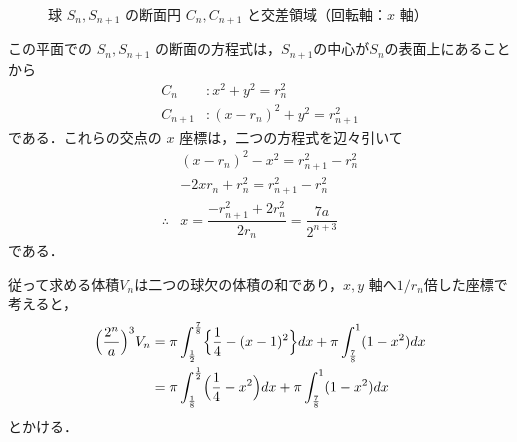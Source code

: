 \documentclass[../../main.tex]{subfiles}
\begin{document}
\begin{figure}[htb]
  \caption{球 $S_n, S_{n+1}$ の断面円 $C_n, C_{n+1}$ と交差領域（回転軸：$x$ 軸）}
  \label{fig:sphere_intersection_cross_section}
\end{figure}

この平面での $S_n, S_{n+1}$ の断面の方程式は，$S_{n+1}$の中心が$S_{n}$の表面上にあることから
\begin{align}
  C_n &: x^2 + y^2 = r_n^2 \\
  C_{n+1} &: (x - r_n)^2 + y^2 = r_{n+1}^2
\end{align}
である．これらの交点の $x$ 座標は，二つの方程式を辺々引いて
\begin{align}
  & (x - r_n)^2 - x^2 = r_{n+1}^2 - r_{n}^2 \\
  & -2xr_n + r_n^2 = r_{n+1}^2 - r_{n}^2 \\
  \therefore
  & x = \dfrac{-r_{n+1}^2 + 2r_{n}^2}{2r_{n}} = \dfrac{7a}{2^{n+3}}
\end{align}
である．

従って求める体積$V_n$は二つの球欠の体積の和であり，$x, y$ 軸へ$1/r_n$倍した座標で考えると，
\begin{align}
  \Bigl( \dfrac{2^n}{a} \Bigr)^3 V_n
  &= \pi \int_{\frac{1}{2}}^{\frac{7}{8}} \Bigl\{ \dfrac{1}{4} - (x-1)^2 \Bigr\} dx + \pi \int_{\frac{7}{8}}^1 (1 - x^2) dx \\
  &= \pi \int_{\frac{1}{8}}^{\frac{1}{2}} \Bigl( \dfrac{1}{4} - x^2 \Bigr) dx + \pi \int_{\frac{7}{8}}^1 (1 - x^2) dx \label{eq:2}
\end{align}
とかける．
\end{document}
